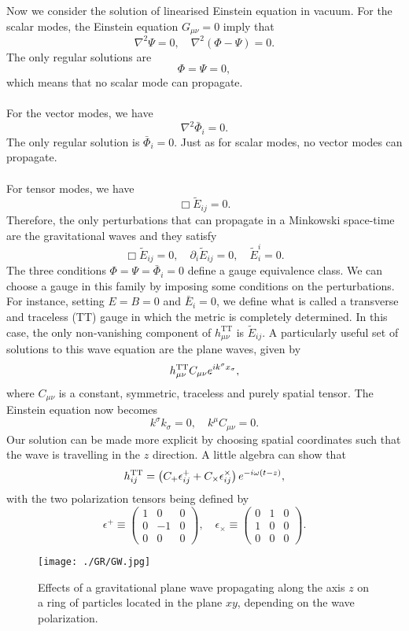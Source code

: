 Now we consider the solution of linearised Einstein equation in vacuum.
For the scalar modes, the Einstein equation $G_{\mu\nu} = 0$ imply that
\[\nabla^2 \Psi = 0 , \quad \nabla^2(\Phi-\Psi) = 0.\]
The only regular solutions are
\[\Phi = \Psi = 0,\]
which means that no scalar mode can propagate.
\\ \\
For the vector modes, we have
\[\nabla^2 \bar{\Phi}_i = 0.\]
The only regular solution is $\bar{\Phi}_i = 0$. Just as for scalar modes, no vector modes can propagate.
\\ \\
For tensor modes, we have
\[\Box \tilde{E}_{ij} = 0.\]
Therefore, the only perturbations that can propagate in a Minkowski space-time are the gravitational waves and they satisfy
\[\Box \tilde{E}_{ij} = 0 , \quad \partial_i \tilde{E}_{ij} = 0 , \quad \tilde{E}^i_i = 0.\]
The three conditions $\Phi = \Psi = \bar{\Phi}_i = 0$ define a gauge equivalence class. We can choose a gauge in this family by imposing some conditions on the perturbations. For instance, setting $E = B = 0$ and $\bar{E}_i = 0$, we define what is called a transverse and traceless (TT) gauge in which the metric is completely determined. In this case, the only non-vanishing component of $h_{\mu\nu}^{\mathrm{TT}}$ is $\tilde{E}_{ij}$.
A particularly useful set of solutions to this wave 
equation are the plane waves, given by
\[h^{\rm TT}_{\mu\nu} C_{\mu\nu}e^{ik^{\sigma}x_{\sigma}},\]
where $C_{\mu\nu}$ is a constant, symmetric, traceless
and purely spatial tensor. The Einstein equation  now becomes
\[k^{\sigma}k_{\sigma} = 0, \quad k^{\mu} C_{\mu\nu} = 0.\]
Our solution can be made more explicit by choosing spatial coordinates such that the wave is travelling in the $z$ direction. A little algebra can show that
\[h_{ij}^{\rm TT} = \left( C_{+}\epsilon^+_{ij} + C_{\times} \epsilon^{\times}_{ij} \right) e^{-i\omega(t-z)},\]
with the two polarization tensors being defined by
\[\epsilon^+ \equiv \begin{pmatrix}
1 & 0 & 0\\ 0 & -1 & 0 \\ 0 & 0 & 0
\end{pmatrix} , \quad \epsilon_{\times} \equiv \begin{pmatrix}
0 & 1 & 0\\ 1 & 0 & 0 \\ 0 & 0 & 0
\end{pmatrix} .\]
\begin{figure}[!h]
\centering
\texttt{[image: ./GR/GW.jpg]}
\caption{Effects of a gravitational plane wave propagating along the axis $z$ on a ring of particles located in the plane $xy$, depending on the wave polarization.}
\end{figure}
